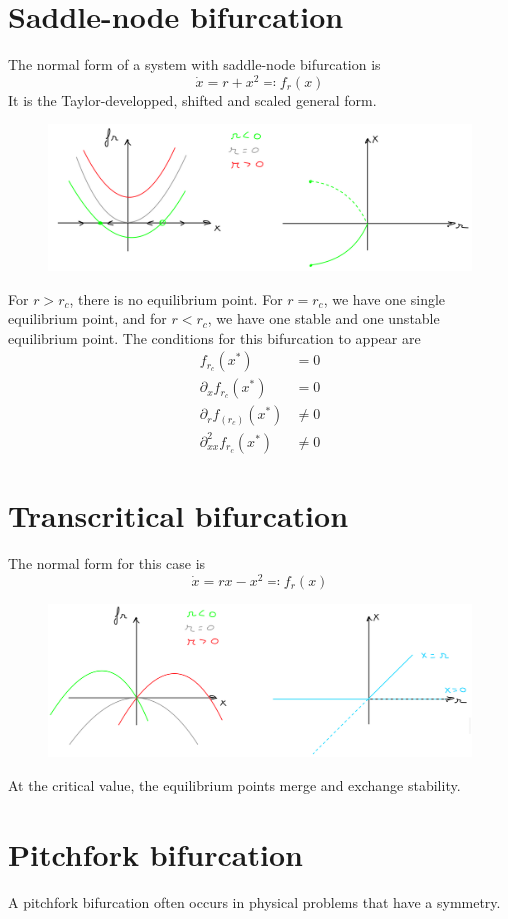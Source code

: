 \documentclass[12pt, openany]{report}
\theoremstyle{definition}
\begin{document}
\section{Saddle-node bifurcation}
The normal form of a system with saddle-node bifurcation is 
\begin{equation}
    \dot x = r+x^2 \eqcolon f_r(x)
\end{equation}
It is the Taylor-developped, shifted and scaled general form.
\begin{figure}[H]
    \centering
    \includegraphics[width=.5\textwidth]{img/saddle_node_bif.png}
\end{figure}
For $r>r_c$, there is no equilibrium point. For $r=r_c$, we have one single equilibrium point, and for $r<r_c$, we have one stable and one unstable equilibrium point. The conditions for this bifurcation to appear are
\begin{align}
    f_{r_c}(x^*)&=0\nonumber\\
    \partial_x f_{r_c}(x^*)&=0\nonumber\\
    \partial_r f_{(r_c)}(x^*)&\neq 0\\
    \partial^2_{xx} f_{r_c}(x^*)&\neq 0\nonumber
\end{align}
\section{Transcritical bifurcation}
The normal form for this case is 
\begin{equation}
    \dot x= rx-x^2\eqcolon f_r(x)
\end{equation}
\begin{figure}[H]
    \centering
    \includegraphics[width = .5\textwidth]{img/transcritical_bif.png}
\end{figure}
At the critical value, the equilibrium points merge and exchange stability. 
\section{Pitchfork bifurcation}
A pitchfork bifurcation often occurs in physical problems that have a symmetry. 
\end{document}
